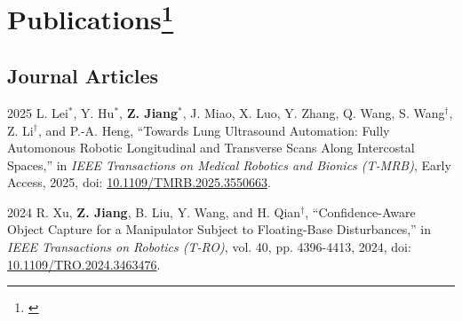 \documentclass[11pt,letterpaper]{report}
\begin{document}
\section*{Publications\protect\footnote{\label{authorship}}}
\subsection*{Journal Articles}
\begin{tablist}
%	
%	
%	
	\item[2025]	 \tab{}L. Lei$^*$, Y. Hu$^*$, \textbf{Z. Jiang}$^*$, J. Miao, X. Luo, Y. Zhang, Q. Wang, S. Wang$^\dagger$, Z. Li$^\dagger$, and P.-A. Heng, ``Towards Lung Ultrasound Automation: Fully Automonous Robotic Longitudinal and Transverse Scans Along Intercostal Spaces,'' in \textit{IEEE Transactions on Medical Robotics and Bionics (T-MRB)}, Early Access, 2025, doi: \href{https://doi.org/10.1109/TMRB.2025.3550663}{10.1109/TMRB.2025.3550663}.
	
	\item[2024]  \tab{}R. Xu, \textbf{Z. Jiang}, B. Liu, Y. Wang, and H. Qian$^\dagger$, ``Confidence-Aware Object Capture for a Manipulator Subject to Floating-Base Disturbances,'' in \textit{IEEE Transactions on Robotics (T-RO)}, vol. 40, pp. 4396-4413, 2024,  doi: \href{https://doi.org/10.1109/TRO.2024.3463476}{10.1109/TRO.2024.3463476}.
\end{tablist}
	
\end{document}
